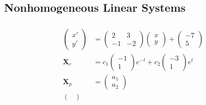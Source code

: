 \documentclass{article}
\begin{document}
\subsection{Nonhomogeneous Linear Systems}

\subsubsection{}

\begin{align*}
  \begin{pmatrix}
    x' \\
    y'
  \end{pmatrix} & = \begin{pmatrix}
                      2  & 3  \\
                      -1 & -2
                    \end{pmatrix} \begin{pmatrix}
                                    x \\
                                    y
                                  \end{pmatrix} + \begin{pmatrix}
                                                    -7 \\
                                                    5
                                                  \end{pmatrix}                        \\
  \mathbf{X}_c    & = c_1 \begin{pmatrix}
                            -1 \\
                            1
                          \end{pmatrix} e^{-t} + c_2 \begin{pmatrix}
                                                       -3 \\
                                                       1
                                                     \end{pmatrix} e^t                  \\
  \mathbf{X}_p    & = \begin{pmatrix}
                        a_1 \\
                        a_2
                      \end{pmatrix}                                                    \\
  \begin{pmatrix}

\end{pmatrix}
\end{align*}
\end{document}
